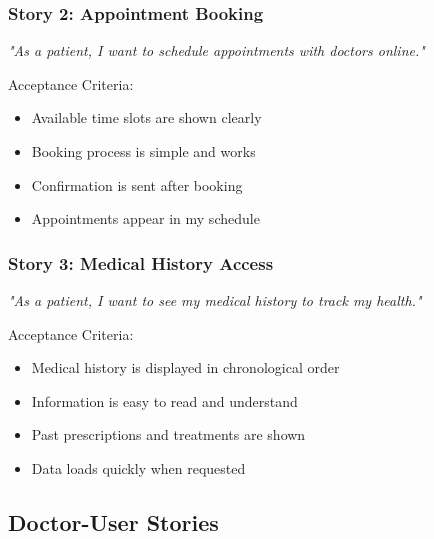 \documentclass[12pt,a4paper]{article}
\begin{document}
\subsubsection{Story 2: Appointment Booking}

\begin{center}
    \textit{"As a patient, I want to schedule appointments with doctors online."}
\end{center}

Acceptance Criteria:
\begin{itemize}[itemsep=0.1cm]
    \item Available time slots are shown clearly
    \item Booking process is simple and works
    \item Confirmation is sent after booking
    \item Appointments appear in my schedule
\end{itemize}

\subsubsection{Story 3: Medical History Access}

\begin{center}
    \textit{"As a patient, I want to see my medical history to track my health."}
\end{center}

Acceptance Criteria:
\begin{itemize}[itemsep=0.1cm]
    \item Medical history is displayed in chronological order
    \item Information is easy to read and understand
    \item Past prescriptions and treatments are shown
    \item Data loads quickly when requested
\end{itemize}

\subsection{Doctor-User Stories}
\end{document}
